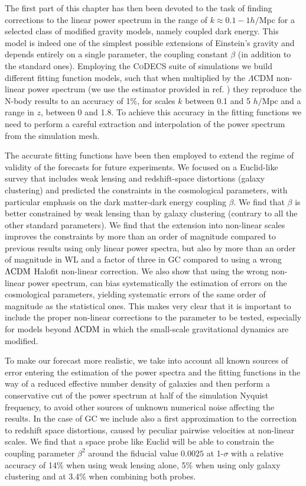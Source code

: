 The first part of this chapter has then been devoted to the task of
finding corrections to the linear power spectrum in the range of $k\approx0.1-1h/$Mpc
for a selected class of modified gravity models, namely coupled dark
energy. This model is indeed one of the simplest possible extensions
of Einstein's gravity and depends entirely on a single parameter,
the coupling constant $\beta$ (in addition to the standard ones).
Employing the \textsc{CoDECS} suite of simulations \citep{baldi_codecs_2012}
we build different fitting function models, such that when multiplied
by the $\Lambda$CDM non-linear power spectrum (we use the estimator
provided in ref. \citep{heitmann_coyote_2014} ) they reproduce the
N-body results to an accuracy of 1\%, for scales $k$ between 0.1
and 5 $h/\mbox{Mpc}$ and a range in $z$, between 0 and 1.8. To achieve
this accuracy in the fitting functions we need to perform a careful
extraction and interpolation of the power spectrum from the simulation
mesh.

The accurate fitting functions have been then employed to extend the
regime of validity of the forecasts for future experiments. We focused
on a Euclid-like survey that includes weak lensing and redshift-space
distortions (galaxy clustering) and predicted the constraints in the
cosmological parameters, with particular emphasis on the dark matter-dark
energy coupling $\beta$. We find that $\beta$ is better constrained
by weak lensing than by galaxy clustering (contrary to all the other
standard parameters). We find that the extension into non-linear scales
improves the constraints by more than an order of magnitude compared
to previous results using only linear power spectra, but also by more
than an order of magnitude in WL and a factor of three in GC compared
to using a wrong $\Lambda\mathrm{CDM}$ Halofit non-linear correction. We also show
that using the wrong non-linear power spectrum, can bias systematically
the estimation of errors on the cosmological parameters, yielding
systematic errors of the same order of magnitude as the statistical
ones. This makes very clear that it is important to include the proper
non-linear corrections to the parameter to be tested, especially for
models beyond $\Lambda\mathrm{CDM}$ in which the small-scale gravitational dynamics
are modified.

To make our forecast more realistic, we take into account all known
sources of error entering the estimation of the power spectra and
the fitting functions in the way of a reduced effective number density
of galaxies and then perform a conservative cut of the power spectrum
at half of the simulation Nyquist frequency, to avoid other sources
of unknown numerical noise affecting the results. In the case of GC
we include also a first approximation to the correction to redshift
space distortions, caused by peculiar pairwise velocities at non-linear
scales. We find that a space probe like Euclid will be able to constrain
the coupling parameter $\beta^{2}$ around the fiducial value $0.0025$
at 1-$\sigma$ with a relative accuracy of 14\% when using weak lensing
alone, 5\% when using only galaxy clustering and at 3.4\% when combining
both probes.


